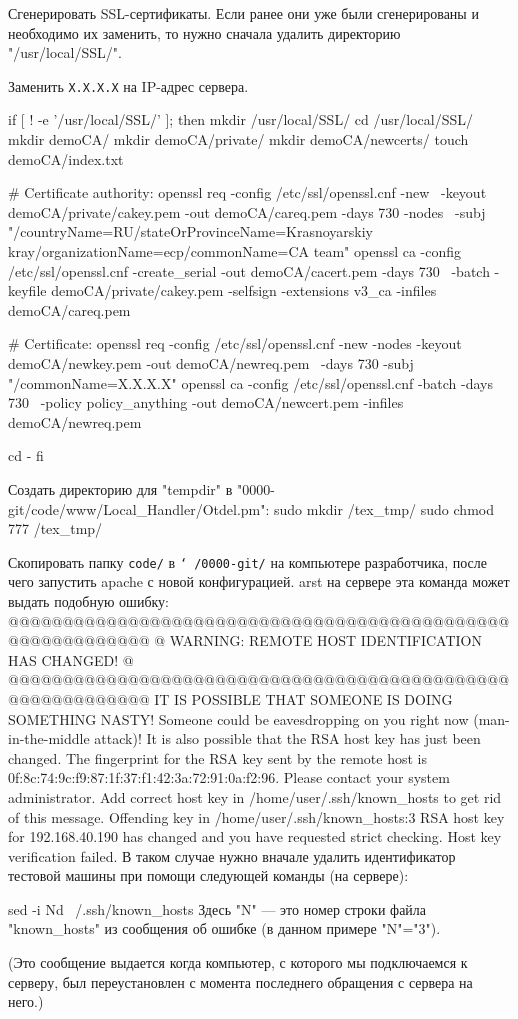 \N
Сгенерировать SSL-сертификаты. Если ранее они уже были сгенерированы и необходимо их заменить, то нужно сначала удалить директорию "/usr/local/SSL/". \par
{} Заменить {\tt X.X.X.X} на IP-адрес сервера. \par
\begintt
if [ ! -e '/usr/local/SSL/' ]; then
  mkdir /usr/local/SSL/
  cd /usr/local/SSL/
  mkdir demoCA/
  mkdir demoCA/private/
  mkdir demoCA/newcerts/
  touch demoCA/index.txt

  # Certificate authority:
  openssl req -config /etc/ssl/openssl.cnf -new \
    -keyout demoCA/private/cakey.pem -out demoCA/careq.pem -days 730 -nodes \
    -subj "/countryName=RU/stateOrProvinceName=Krasnoyarskiy kray/organizationName=ecp/commonName=CA team"
  openssl ca -config /etc/ssl/openssl.cnf -create_serial -out demoCA/cacert.pem -days 730 \
    -batch -keyfile demoCA/private/cakey.pem -selfsign -extensions v3_ca -infiles demoCA/careq.pem

  # Certificate:
  openssl req -config /etc/ssl/openssl.cnf -new -nodes -keyout demoCA/newkey.pem -out demoCA/newreq.pem \
    -days 730 -subj "/commonName=X.X.X.X"
  openssl ca -config /etc/ssl/openssl.cnf -batch -days 730 \
    -policy policy_anything -out demoCA/newcert.pem -infiles demoCA/newreq.pem

  cd -
fi
\endtt
\medskip

\N
Создать директорию для "tempdir" в "0000-git/code/www/Local_Handler/Otdel.pm":
\begtt
sudo mkdir /tex_tmp/
sudo chmod 777 /tex_tmp/
\endtt
\medskip

\N
Скопировать папку {\tt code/} в {\tt \char`~/0000-git/} на компьютере разработчика, после чего запустить apache с новой конфигурацией.
\begintt
arst
\endtt
{} на сервере эта команда может выдать подобную ошибку:
\begtt
@@@@@@@@@@@@@@@@@@@@@@@@@@@@@@@@@@@@@@@@@@@@@@@@@@@@@@@@@@@
@    WARNING: REMOTE HOST IDENTIFICATION HAS CHANGED!     @
@@@@@@@@@@@@@@@@@@@@@@@@@@@@@@@@@@@@@@@@@@@@@@@@@@@@@@@@@@@
IT IS POSSIBLE THAT SOMEONE IS DOING SOMETHING NASTY!
Someone could be eavesdropping on you right now (man-in-the-middle attack)!
It is also possible that the RSA host key has just been changed.
The fingerprint for the RSA key sent by the remote host is
0f:8c:74:9c:f9:87:1f:37:f1:42:3a:72:91:0a:f2:96.
Please contact your system administrator.
Add correct host key in /home/user/.ssh/known_hosts to get rid of this message.
Offending key in /home/user/.ssh/known_hosts:3
RSA host key for 192.168.40.190 has changed and you have requested strict checking.
Host key verification failed.
\endtt
\noindent В таком случае нужно вначале удалить идентификатор тестовой машины при помощи следующей команды (на сервере): \par\nobreak
\begtt
sed -i Nd ~/.ssh/known_hosts
\endtt
\noindent Здесь "N" --- это номер строки файла "known_hosts" из сообщения об ошибке (в данном примере "N"="3"). \par
\noindent (Это сообщение выдается когда компьютер, с которого мы подключаемся к серверу, был переустановлен с момента последнего обращения с сервера на него.)

